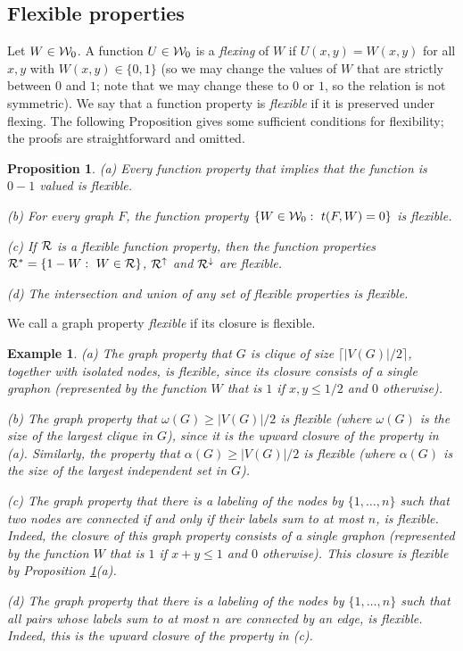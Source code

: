 \documentclass{article}
\newtheorem{prop}[theorem]{Proposition}
\newtheorem{example}[theorem]{Example}
\begin{document}
\subsection{Flexible properties}\label{FLEXIBLE}

Let $W\in\mathcal{W}_0$. A function $U\in\mathcal{W}_0$ is a {\it flexing} of $W$ if
$U(x,y)=W(x,y)$ for all $x,y$ with $W(x,y)\in\{0,1\}$ (so we may
change the values of $W$ that are strictly between $0$ and $1$; note
that we may change these to $0$ or $1$, so the relation is not
symmetric). We say that a function property is {\it flexible} if it
is preserved under flexing. The following Proposition gives some
sufficient conditions for flexibility; the proofs are straightforward
and omitted.

\begin{prop}\label{PROP:FUNC-FLEX}
{\rm (a)} Every function property that implies that the function is
$0-1$ valued is flexible.

\smallskip

{\rm (b)} For every graph $F$, the function property
$\{W\in\mathcal{W}_0:~t(F,W)=0\}$ is flexible.

\smallskip

{\rm (c)} If $\mathcal{R}$ is a flexible function property, then the function
properties $\mathcal{R}^*=\{1-W:~W\in\mathcal{R}\}$, $\mathcal{R}^\uparrow$ and
$\mathcal{R}^\downarrow$ are flexible.

\smallskip

{\rm (d)} The intersection and union of any set of flexible
properties is flexible.
\end{prop}

We call a graph property {\it flexible} if its closure is flexible.

\begin{example}\label{ex:FLEX-GR}
(a) The graph property that $G$ is clique of size $\lceil
|V(G)|/2\rceil$, together with isolated nodes, is flexible, since its
closure consists of a single graphon (represented by the function $W$
that is $1$ if $x,y\le 1/2$ and $0$ otherwise).

\smallskip

(b) The graph property that $\omega(G)\ge |V(G)|/2$ is flexible
(where $\omega(G)$ is the size of the largest clique in $G$), since
it is the upward closure of the property in (a). Similarly, the
property that $\alpha(G)\ge |V(G)|/2$ is flexible (where $\alpha(G)$
is the size of the largest independent set in $G$).

\smallskip

(c) The graph property that there is a labeling of the nodes by
$\{1,\dots,n\}$ such that two nodes are connected if and only if
their labels sum to at most $n$, is flexible. Indeed, the closure of
this graph property consists of a single graphon (represented by the
function $W$ that is $1$ if $x+y\le 1$ and $0$ otherwise). This
closure is flexible by Proposition \ref{PROP:FUNC-FLEX}(a).

\smallskip

(d) The graph property that there is a labeling of the nodes by
$\{1,\dots,n\}$ such that all pairs whose labels sum to at most $n$
are connected by an edge, is flexible. Indeed, this is the upward
closure of the property in (c).
\end{example}
\end{document}
